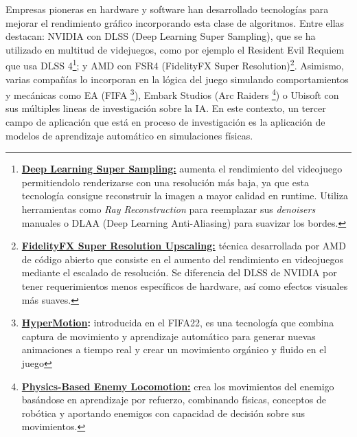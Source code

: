 Empresas pioneras en hardware y software han desarrollado tecnologías para mejorar el rendimiento gráfico incorporando esta clase de algoritmos. Entre ellas destacan: NVIDIA con DLSS (Deep Learning Super Sampling), que se ha utilizado en multitud de videjuegos, como por ejemplo el Resident Evil Requiem que usa DLSS 4\footnote{ \textbf{\href{https://www.nvidia.com/es-la/geforce/news/dlss-4-rtx-path-tracing-game-announcements-ces-2026/}{Deep Learning Super Sampling:}} aumenta el rendimiento del videojuego permitiendolo renderizarse con una resolución más baja, ya que esta tecnología consigue reconstruir la imagen a mayor calidad en runtime. Utiliza herramientas como \textit{Ray Reconstruction} para reemplazar sus \textit{denoisers} manuales o DLAA (Deep Learning Anti-Aliasing) para suavizar los bordes.}; y AMD con FSR4 (FidelityFX Super Resolution)\footnote{ \textbf{\href{https://www.amd.com/en/products/graphics/technologies/fidelityfx/super-resolution.html}{FidelityFX Super Resolution Upscaling:}} técnica desarrollada por AMD de código abierto que consiste en el aumento del rendimiento en videojuegos mediante el escalado de resolución. Se diferencia del DLSS de NVIDIA por tener requerimientos menos específicos de hardware, así como efectos visuales más suaves.}. Asimismo, varias compañías lo incorporan en la lógica del juego simulando comportamientos y mecánicas como EA (FIFA \footnote{\textbf{\href{https://news.ea.com/press-releases/press-releases-details/2021/EA-SPORTS-Introduces-FIFA-22-With-Next-Gen-HyperMotion-Technology-Bringing-Footballs-Most-Realistic-and-Immersive-Gameplay-Experience-to-Life/default.aspx}{HyperMotion}:} introducida en el FIFA22, es una tecnología que combina captura de movimiento y aprendizaje automático para generar nuevas animaciones a tiempo real y crear un movimiento orgánico y fluido en el juego}), Embark Studios (Arc Raiders \footnote{\textbf{\href{https://schedule.gdconf.com/session/learning-to-move-physics-based-enemy-locomotion-in-arc-raiders/917319}{Physics-Based Enemy Locomotion:}} crea los movimientos del enemigo basándose en aprendizaje por refuerzo, combinando físicas, conceptos de robótica y aportando enemigos con capacidad de decisión sobre sus movimientos.}) o Ubisoft con sus múltiples lineas de investigación sobre la IA. En este contexto, un tercer campo de aplicación que está en proceso de investigación es la aplicación de modelos de aprendizaje automático en simulaciones físicas. \newline

